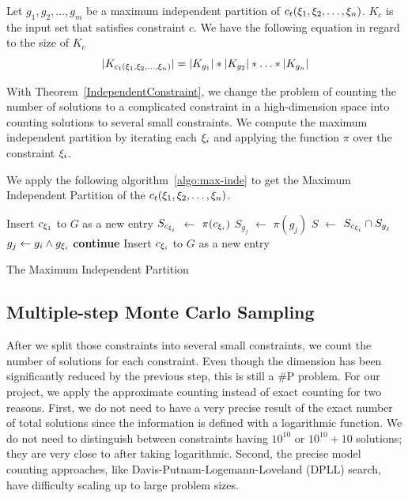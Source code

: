\begin{theorem}
    \label{IndependentConstraint}
    Let $g_{1}, g_{2}, \ldots, g_{m}$ be a maximum independent partition of
    $c_t({\xi}_{1},{\xi}_{2},\ldots,{\xi}_{n})$.
    $K_c$ is the input set that satisfies constraint $c$. We have the following
    equation in regard to the size of $K_c$
    $$|K_{c_t({\xi}_{1},{\xi}_{2},\ldots,{\xi}_{n})}| = |K_{g_{1}}|*|K_{g_{2}}|*\ldots*|K_{g_{n}}|$$
\end{theorem}
With Theorem~\ref{IndependentConstraint}, we change the problem of counting the number of solutions to a complicated constraint in a high-dimension
space into counting solutions to several small constraints. We compute the maximum independent partition by iterating each ${\xi}_{i}$ and applying the function $\pi$ over the constraint ${\xi}_{i}$.

We apply the following
algorithm~\ref{algo:max-inde} to get the Maximum Independent Partition of the
$c_t({\xi}_{1},{\xi}_{2},\ldots,{\xi}_{n})$.


\IncMargin{1em}
\begin{algorithm}[th]\small
    \DontPrintSemicolon
    Insert $c_{{\xi}_{1}}$ to $G$ as a new entry \;
    {
        $S_{c_{{\xi}_{i}}}$ $\leftarrow$ $\pi(c_{{\xi}_{i}})$ \;
        {
            $S_{g_j}$ $\leftarrow$ $\pi(g_{j})$ \;
            $S$ $\leftarrow$ $S_{c_{{\xi}_{i}}} \cap S_{g_j}$  \;
            {
                $g_{j} \leftarrow g_{i} \land g_{{\xi}_{i}}$ \;
                \textbf{continue} \;
            }
            Insert $c_{{\xi}_{i}}$ to $G$ as a new entry \;
        }
    }
    \caption{The Maximum Independent Partition}
    \label{algo:max-inde}
\end{algorithm}
\DecMargin{1em}


\subsection{Multiple-step Monte Carlo Sampling}

After we split those constraints into several small constraints, we count the number of solutions for each constraint. Even though the dimension has been
significantly reduced by the previous step, this is still a \#P problem. For our project, we apply the approximate counting instead of exact counting for two reasons. First, we do not need to have a very precise result of the exact number of total solutions since the information is defined with a logarithmic function. We do not need to distinguish between constraints having $10^{10}$ or $10^{10} + 10$ solutions; they are very close to after taking logarithmic. Second, the
precise model counting approaches, like Davis-Putnam-Logemann-Loveland (DPLL)
search, have difficulty scaling up to large problem sizes.

